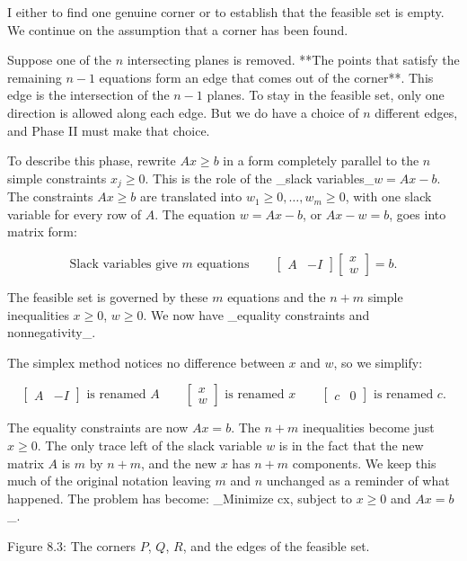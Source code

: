 I either to find one genuine corner or to establish that the feasible set is empty. We continue on the assumption that a corner has been found.

Suppose one of the \(n\) intersecting planes is removed. **The points that satisfy the remaining \(n-1\) equations form an edge that comes out of the corner**. This edge is the intersection of the \(n-1\) planes. To stay in the feasible set, only one direction is allowed along each edge. But we do have a choice of \(n\) different edges, and Phase II must make that choice.

To describe this phase, rewrite \(Ax\geq b\) in a form completely parallel to the \(n\) simple constraints \(x_{j}\geq 0\). This is the role of the _slack variables_\(w=Ax-b\). The constraints \(Ax\geq b\) are translated into \(w_{1}\geq 0,\ldots,w_{m}\geq 0\), with one slack variable for every row of \(A\). The equation \(w=Ax-b\), or \(Ax-w=b\), goes into matrix form:

\[\text{{Slack variables give $m$ equations}}\qquad\begin{bmatrix}A&-I \end{bmatrix}\begin{bmatrix}x\\ w\end{bmatrix}=b.\]

The feasible set is governed by these \(m\) equations and the \(n+m\) simple inequalities \(x\geq 0\), \(w\geq 0\). We now have _equality constraints and nonnegativity_.

The simplex method notices no difference between \(x\) and \(w\), so we simplify:

\[\begin{bmatrix}A&-I\end{bmatrix}\text{ is renamed }A\qquad\begin{bmatrix}x \\ w\end{bmatrix}\text{ is renamed }x\qquad\begin{bmatrix}c&0\end{bmatrix}\text{ is renamed }c.\]

The equality constraints are now \(Ax=b\). The \(n+m\) inequalities become just \(x\geq 0\). The only trace left of the slack variable \(w\) is in the fact that the new matrix \(A\) is \(m\) by \(n+m\), and the new \(x\) has \(n+m\) components. We keep this much of the original notation leaving \(m\) and \(n\) unchanged as a reminder of what happened. The problem has become: _Minimize cx, subject to \(x\geq 0\) and \(Ax=b\)_.

Figure 8.3: The corners \(P\), \(Q\), \(R\), and the edges of the feasible set.

 